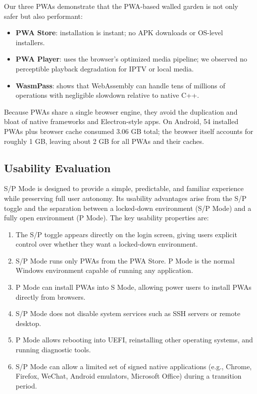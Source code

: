 Our three PWAs demonstrate that the PWA-based walled garden is not only safer but also performant:

\begin{itemize}
    \item \textbf{PWA Store}: installation is instant; no APK downloads or OS-level installers.
    \item \textbf{PWA Player}: uses the browser’s optimized media pipeline; we observed no perceptible playback degradation for IPTV or local media.
    \item \textbf{WasmPass}: shows that WebAssembly can handle tens of millions of operations with negligible slowdown relative to native C++.
\end{itemize}

Because PWAs share a single browser engine, they avoid the duplication and bloat of native frameworks and Electron-style apps. On Android, 54 installed PWAs plus browser cache consumed 3.06 GB total; the browser itself accounts for roughly 1 GB, leaving about 2 GB for all PWAs and their caches.

\subsection{Usability Evaluation}

S/P Mode is designed to provide a simple, predictable, and familiar experience while preserving full user autonomy. Its usability advantages arise from the S/P toggle and the separation between a locked-down environment (S/P Mode) and a fully open environment (P Mode). The key usability properties are:

\begin{enumerate}
    \item The S/P toggle appears directly on the login screen, giving users explicit control over whether they want a locked-down environment.
    \item S/P Mode runs only PWAs from the PWA Store. P Mode is the normal Windows environment capable of running any application.
    \item P Mode can install PWAs into S Mode, allowing power users to install PWAs directly from browsers.
    \item S/P Mode does not disable system services such as SSH servers or remote desktop.
    \item P Mode allows rebooting into UEFI, reinstalling other operating systems, and running diagnostic tools.
    \item S/P Mode can allow a limited set of signed native applications (e.g., Chrome, Firefox, WeChat, Android emulators, Microsoft Office) during a transition period.
\end{enumerate}


